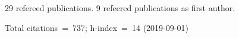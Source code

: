 29 refereed publications. 9 refeered publications as first author.

Total citations~=~737; h-index~=~14 (2019-09-01)